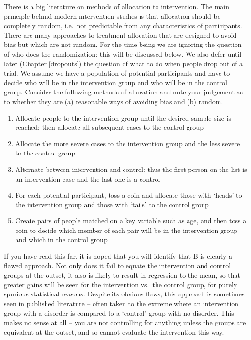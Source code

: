 \documentclass{krantz}
\providecommand{\tightlist}{%
\setlength{\itemsep}{0pt}\setlength{\parskip}{0pt}}
\begin{document}
There is a big literature on methods of allocation to intervention. The main principle behind modern intervention studies is that allocation should be completely random, i.e.~not predictable from any characteristics of participants. There are many approaches to treatment allocation that are designed to avoid bias but which are not random. For the time being we are ignoring the question of who does the randomization: this will be discussed below. We also defer until later (Chapter \ref{dropouts}) the question of what to do when people drop out of a trial. We assume we have a population of potential participants and have to decide who will be in the intervention group and who will be in the control group. Consider the following methods of allocation and note your judgement as to whether they are (a) reasonable ways of avoiding bias and (b) random.

\begin{enumerate}
\def\labelenumi{\Alph{enumi}.}
\tightlist
\item
  Allocate people to the intervention group until the desired sample size is reached; then allocate all subsequent cases to the control group~
\item
  Allocate the more severe cases to the intervention group and the less severe to the control group\\
\item
  Alternate between intervention and control: thus the first person on the list is an intervention case and the last one is a control\\
\item
  For each potential participant, toss a coin and allocate those with `heads' to the intervention group and those with `tails' to the control group\\
\item
  Create pairs of people matched on a key variable such as age, and then toss a coin to decide which member of each pair will be in the intervention group and which in the control group
\end{enumerate}

If you have read this far, it is hoped that you will identify that B is clearly a flawed approach. Not only does it fail to equate the intervention and control groups at the outset, it also is likely to result in regression to the mean, so that greater gains will be seen for the intervention vs.~the control group, for purely spurious statistical reasons. Despite its obvious flaws, this approach is sometimes seen in published literature -- often taken to the extreme where an intervention group with a disorder is compared to a `control' group with no disorder. This makes no sense at all -- you are not controlling for anything unless the groups are equivalent at the outset, and so cannot evaluate the intervention this way.
\end{document}
